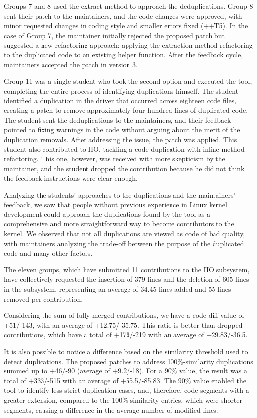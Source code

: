 \documentclass[10pt,conference]{IEEEtran}
\begin{document}
Groups 7 and 8 used the extract method to approach the deduplications. Group 8 sent their patch to the maintainers, and the code changes were approved, with minor requested changes in coding style and smaller errors fixed (++T5). In the case of Group 7, the maintainer initially rejected the proposed patch but suggested a new refactoring approach: applying the extraction method refactoring to the duplicated code to an existing helper function. After the feedback cycle, maintainers accepted the patch in version 3.


Group 11 was a single student who took the second option and executed the tool, completing the entire process of identifying duplications himself. The student identified a duplication in the driver that occurred across eighteen code files, creating a patch to remove approximately four hundred lines of duplicated code. The student sent the deduplications to the maintainers, and their feedback pointed to fixing warnings in the code without arguing about the merit of the duplication removals. After addressing the issue, the patch was applied. This student also contributed to IIO, tackling a code duplication with inline method refactoring. This one, however, was received with more skepticism by the maintainer, and the student dropped the contribution because he did not think the feedback instructions were clear enough.

Analyzing the students' approaches to the duplications and the maintainers' feedback, we saw that people without previous experience in Linux kernel development could approach the duplications found by the tool as a comprehensive and more straightforward way to become contributors to the kernel. We observed that not all duplications are viewed as code of bad quality, with maintainers analyzing the trade-off between the purpose of the duplicated code and many other factors.

The eleven groups, which have submitted 11 contributions to the IIO subsystem, have collectively requested the insertion of 379 lines and the deletion of 605 lines in the subsystem, representing an average of 34.45 lines added and 55 lines removed per contribution.

Considering the sum of fully merged contributions, we have a code diff value of +51/-143, with an average of +12.75/-35.75. This ratio is better than dropped contributions, which have a total of +179/-219 with an average of +29.83/-36.5.

It is also possible to notice a difference based on the similarity threshold used to detect duplications. The proposed patches to address 100\%-similarity duplications summed up to +46/-90 (average of +9.2/-18). For a 90\% value, the result was a total of +333/-515 with an average of +55.5/-85.83. The 90\% value enabled the tool to identify less strict duplication cases, and, therefore, code segments with a greater extension, compared to the 100\% similarity entries, which were shorter segments, causing a difference in the average number of modified lines.
\end{document}
